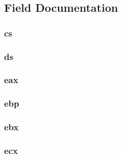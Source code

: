 \subsection{Field Documentation}
\hypertarget{structregisters_aff16eb39266599b77ad4025e1cf36c4e}{
\subsubsection[{cs}]{ {\bf cs}}}
\label{structregisters_aff16eb39266599b77ad4025e1cf36c4e}
\hypertarget{structregisters_a27b615cc9d414c57f335c1744908fbd1}{
\subsubsection[{ds}]{ {\bf ds}}}
\label{structregisters_a27b615cc9d414c57f335c1744908fbd1}
\hypertarget{structregisters_aa4608f9844ee6e6e638c487a8c8aa14f}{
\subsubsection[{eax}]{ {\bf eax}}}
\label{structregisters_aa4608f9844ee6e6e638c487a8c8aa14f}
\hypertarget{structregisters_a98b65807686fee47d4061d2f2ea8578a}{
\subsubsection[{ebp}]{ {\bf ebp}}}
\label{structregisters_a98b65807686fee47d4061d2f2ea8578a}
\hypertarget{structregisters_aab632bcfbdfeee937cc42940432af39a}{
\subsubsection[{ebx}]{ {\bf ebx}}}
\label{structregisters_aab632bcfbdfeee937cc42940432af39a}
\hypertarget{structregisters_aab67c5aaaf6afb6a2c47a4c81fb0d567}{
\subsubsection[{ecx}]{ {\bf ecx}}}
